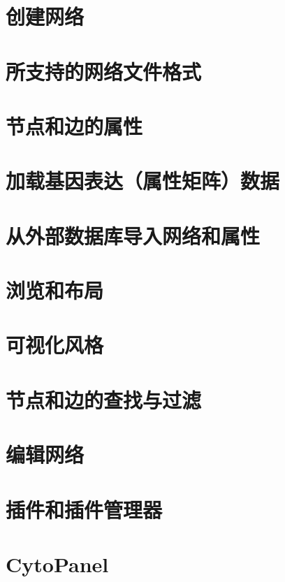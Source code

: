 \documentclass[a4paper, oneside]{book}
\begin{document}
\begin{CJK}{UTF8}{gbsn}
\chapter{创建网络}


\chapter{所支持的网络文件格式}
\label{ch06}


\chapter{节点和边的属性}


\chapter{加载基因表达（属性矩阵）数据}


\chapter{从外部数据库导入网络和属性}


\chapter{浏览和布局}


\chapter{可视化风格}


\chapter{节点和边的查找与过滤}


\chapter{编辑网络}


\chapter{插件和插件管理器}


\chapter{CytoPanel}



\end{CJK}
\end{document}
